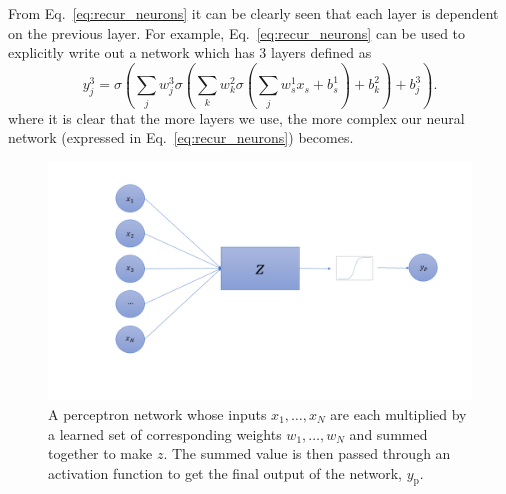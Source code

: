From Eq.~\ref{eq:recur_neurons} it can be 
clearly seen that each layer is dependent on the previous layer. 
For example, 
Eq.~\ref{eq:recur_neurons} can be used to explicitly write out a 
network which has 3 layers defined as
%
\begin{equation}
    y^{3}_j = \sigma\left(\sum_{j}w^{3}_{j}\sigma\left(\sum_{k}w^{2}_{k}\sigma\left(\sum_{j}w^{1}_{s}x_s + b^{1}_{s}\right) + b^{2}_{k}\right) + b^{3}_{j}\right).
\end{equation}
where it is clear that the more layers we use, the more complex our neural 
network (expressed in Eq.~\ref{eq:recur_neurons}) becomes. 
%
%
%
%
\begin{figure}
    \centering
    \includegraphics[width=\linewidth]{figures/Perceptron_network.png}
    \caption[Perceptron network illustration]{A perceptron network whose inputs $x_{1},\ldots, x_{N}$ are each multiplied by a learned set of corresponding weights $w_1, \ldots, w_N$ and summed together to make $z$. The summed value is then passed through an activation function to get the final output of the network, $y_{\mathrm{p}}$.~}
    \label{fig:Perceptron_network}
\end{figure}


